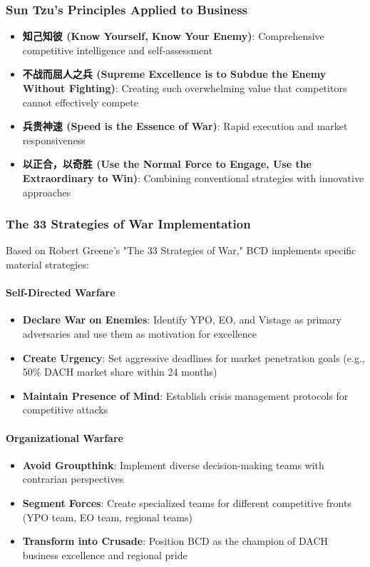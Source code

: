 \subsubsection{Sun Tzu's Principles Applied to Business}

\begin{itemize}
    \item \textbf{知己知彼 (Know Yourself, Know Your Enemy)}: Comprehensive competitive intelligence and self-assessment
    \item \textbf{不战而屈人之兵 (Supreme Excellence is to Subdue the Enemy Without Fighting)}: Creating such overwhelming value that competitors cannot effectively compete
    \item \textbf{兵贵神速 (Speed is the Essence of War)}: Rapid execution and market responsiveness
    \item \textbf{以正合，以奇胜 (Use the Normal Force to Engage, Use the Extraordinary to Win)}: Combining conventional strategies with innovative approaches
\end{itemize}

\subsubsection{The 33 Strategies of War Implementation}

Based on Robert Greene's "The 33 Strategies of War," BCD implements specific material strategies:

\paragraph{Self-Directed Warfare}
\begin{itemize}
    \item \textbf{Declare War on Enemies}: Identify YPO, EO, and Vistage as primary adversaries and use them as motivation for excellence
    \item \textbf{Create Urgency}: Set aggressive deadlines for market penetration goals (e.g., 50\% DACH market share within 24 months)
    \item \textbf{Maintain Presence of Mind}: Establish crisis management protocols for competitive attacks
\end{itemize}

\paragraph{Organizational Warfare}
\begin{itemize}
    \item \textbf{Avoid Groupthink}: Implement diverse decision-making teams with contrarian perspectives
    \item \textbf{Segment Forces}: Create specialized teams for different competitive fronts (YPO team, EO team, regional teams)
    \item \textbf{Transform into Crusade}: Position BCD as the champion of DACH business excellence and regional pride
\end{itemize}

